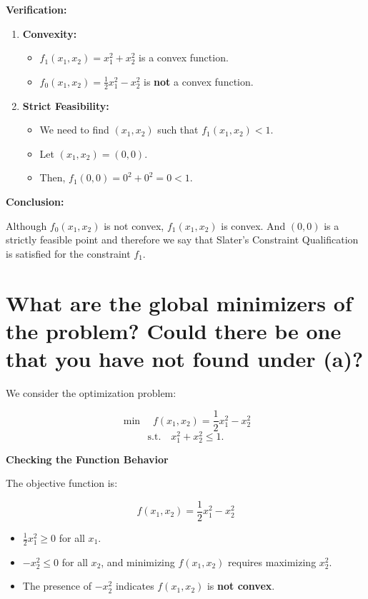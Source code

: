 \documentclass{article}
\begin{document}
\textbf{Verification:}

\begin{enumerate}
    \item \textbf{Convexity:}
        \begin{itemize}
            \item $f_1(x_1, x_2) = x_1^2 + x_2^2$ is a convex function.
            \item $f_0(x_1, x_2) = \frac{1}{2}x_1^2 - x_2^2$ is \textbf{not} a convex function.
        \end{itemize}
    \item \textbf{Strict Feasibility:}
        \begin{itemize}
            \item We need to find $(x_1, x_2)$ such that $f_1(x_1, x_2) < 1$.
            \item Let $(x_1, x_2) = (0, 0)$.
            \item Then, $f_1(0, 0) = 0^2 + 0^2 = 0 < 1$.
        \end{itemize}
\end{enumerate}

\textbf{Conclusion:}

Although $f_0(x_1, x_2)$ is not convex, $f_1(x_1, x_2)$ is convex. And $(0, 0)$ is a strictly feasible point and therefore we say that Slater's Constraint Qualification is satisfied for the constraint $f_1$.

\newpage
\section{What are the global minimizers of the problem? Could there be one that you have
 not found under (a)?}
We consider the optimization problem:

\begin{equation}
\min \quad f(x_1, x_2) = \frac{1}{2} x_1^2 - x_2^2
\end{equation}
\begin{equation}
\text{s.t.} \quad x_1^2 + x_2^2 \leq 1.
\end{equation}

\textbf{Checking the Function Behavior}

The objective function is:

\begin{equation}
f(x_1, x_2) = \frac{1}{2} x_1^2 - x_2^2
\end{equation}

\begin{itemize}
    \item $\frac{1}{2} x_1^2 \geq 0$ for all $x_1$.
    \item $-x_2^2 \leq 0$ for all $x_2$, and minimizing $f(x_1, x_2)$ requires maximizing $x_2^2$.
    \item The presence of $-x_2^2$ indicates $f(x_1, x_2)$ is \textbf{not convex}.
\end{itemize}
\end{document}
